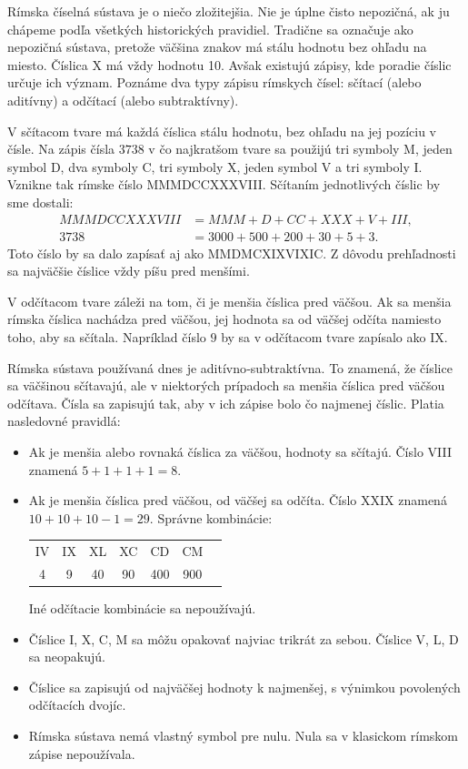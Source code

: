\documentclass{report}
\begin{document}
Rímska číselná sústava je o niečo zložitejšia. Nie je úplne čisto nepozičná, ak ju chápeme podľa všetkých historických pravidiel. Tradične sa označuje ako nepozičná sústava, pretože väčšina znakov má stálu hodnotu bez ohľadu na miesto. Číslica X má vždy hodnotu 10. Avšak existujú zápisy, kde poradie číslic určuje ich význam. Poznáme dva typy zápisu rímskych čísel: sčítací (alebo aditívny) a odčítací (alebo subtraktívny).

V sčítacom tvare má každá číslica stálu hodnotu, bez ohľadu na jej pozíciu v čísle. Na zápis čísla \(3738\) v čo najkratšom tvare sa použijú tri symboly M, jeden symbol D, dva symboly C, tri symboly X, jeden symbol V a tri symboly I. Vznikne tak rímske číslo MMMDCCXXXVIII. Sčítaním jednotlivých číslic by sme dostali:
\begin{align*}
  MMMDCCXXXVIII &= MMM + D + CC + XXX + V + III, \\
  3738 &= 3000 + 500 + 200 + 30 + 5 + 3.
\end{align*}
Toto číslo by sa dalo zapísať aj ako MMDMCXIXVIXIC. Z dôvodu prehľadnosti sa najväčšie číslice vždy píšu pred menšími.

V odčítacom tvare záleži na tom, či je menšia číslica pred väčšou. Ak sa menšia rímska číslica nachádza pred väčšou, jej hodnota sa od väčšej odčíta namiesto toho, aby sa sčítala. Napríklad číslo \(9\) by sa v odčítacom tvare zapísalo ako IX.

Rímska sústava používaná dnes je aditívno‑subtraktívna. To znamená, že číslice sa väčšinou sčítavajú, ale v niektorých prípadoch sa menšia číslica pred väčšou odčítava. Čísla sa zapisujú tak, aby v ich zápise bolo čo najmenej číslic. Platia nasledovné pravidlá:

\begin{itemize}
  \item Ak je menšia alebo rovnaká číslica za väčšou, hodnoty sa sčítajú. Číslo VIII znamená \(5 + 1 + 1 + 1 = 8\).
  \item Ak je menšia číslica pred väčšou, od väčšej sa odčíta. Číslo XXIX znamená \(10 + 10 + 10 - 1 = 29\). Správne kombinácie:
  \begin{center}
    \begin{tabular}{|c|c|c|c|c|c|c|}
    IV & IX & XL & XC & CD & CM \\
    4 & 9 & 40 & 90 & 400 & 900 \\
    \end{tabular}
  \end{center}
  Iné odčítacie kombinácie sa nepoužívajú.
  \item Číslice I, X, C, M sa môžu opakovať najviac trikrát za sebou. Číslice V, L, D sa neopakujú.
  \item Číslice sa zapisujú od najväčšej hodnoty k najmenšej, s výnimkou povolených odčítacích dvojíc.
  \item Rímska sústava nemá vlastný symbol pre nulu. Nula sa v klasickom rímskom zápise nepoužívala.
\end{itemize}
\end{document}
